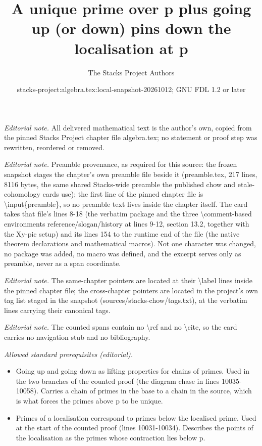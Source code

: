\documentclass[10pt,a4paper]{amsart}
\title{A unique prime over p plus going up (or down) pins down the localisation at p}
\author{The Stacks Project Authors}
\date{stacks-project:algebra.tex:local-snapshot-20261012; GNU FDL 1.2 or later}
\theoremstyle{plain}
\theoremstyle{definition}
\theoremstyle{remark}
\numberwithin{equation}{subsection}
\begin{document}
\maketitle
\noindent\textit{Editorial note.} All delivered mathematical text is the author's own, copied from the pinned Stacks Project chapter file algebra.tex; no statement or proof step was rewritten, reordered or removed.\par\medskip
\noindent\textit{Editorial note.} Preamble provenance, as required for this source: the frozen snapshot stages the chapter's own preamble file beside it (preamble.tex, 217 lines, 8116 bytes, the same shared Stacks-wide preamble the published chow and etale-cohomology cards use); the first line of the pinned chapter file is \textbackslash{}input\{preamble\}, so no preamble text lives inside the chapter itself. The card takes that file's lines 8-18 (the verbatim package and the three \textbackslash{}comment-based environments reference/slogan/history at lines 9-12, section 13.2, together with the Xy-pic setup) and its lines 154 to the runtime end of the file (the native theorem declarations and mathematical macros). Not one character was changed, no package was added, no macro was defined, and the excerpt serves only as preamble, never as a span coordinate.\par\medskip
\noindent\textit{Editorial note.} The same-chapter pointers are located at their \textbackslash{}label lines inside the pinned chapter file; the cross-chapter pointers are located in the project's own tag list staged in the snapshot (sources/stacks-chow/tags.txt), at the verbatim lines carrying their canonical tags.\par\medskip
\noindent\textit{Editorial note.} The counted spans contain no \textbackslash{}ref and no \textbackslash{}cite, so the card carries no navigation stub and no bibliography.\par\medskip
\noindent\textit{Allowed standard prerequisites (editorial).}\begin{itemize}
\item Going up and going down as lifting properties for chains of primes. Used in the two branches of the counted proof (the diagram chase in lines 10035-10058). Carries a chain of primes in the base to a chain in the source, which is what forces the primes above p to be unique.
\item Primes of a localisation correspond to primes below the localised prime. Used at the start of the counted proof (lines 10031-10034). Describes the points of the localisation as the primes whose contraction lies below p.
\end{itemize}\medskip
\end{document}
